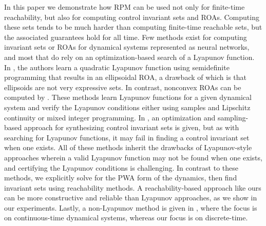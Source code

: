 In this paper we demonstrate how RPM can be used not only for finite-time reachability, but also for computing control invariant sets and ROAs.
Computing these sets tends to be much harder than computing finite-time reachable sets, but the associated guarantees hold for all time. 
Few methods exist for computing invariant sets or ROAs for dynamical systems represented as neural networks, and most that do rely on an optimization-based search of a Lyapunov function. 
In \cite{ellip_roa}, the authors learn a quadratic Lyapunov function using semidefinite programming that results in an ellipsoidal ROA, a drawback of which is that ellipsoids are not very expressive sets. 
In contrast, nonconvex ROAs can be computed by \cite{richards2018lyapunov, chen2021learning, dai2021lyapunov}. 
These methods learn Lyapunov functions for a given dynamical system and verify the Lyapunov conditions either using samples and Lipschitz continuity or mixed integer programming. 
In \cite{control_inv_changliu}, an optimization and sampling-based approach for synthesizing control invariant sets is given, but as with searching for Lyapunov functions, it may fail in finding a control invariant set when one exists. 
All of these methods inherit the drawbacks of Lyapunov-style approaches wherein a valid Lyapunov function may not be found when one exists, and certifying the Lyapunov conditions is challenging.
In contrast to these methods, we explicitly solve for the PWA form of the dynamics, then find invariant sets using reachability methods. 
A reachability-based approach like ours can be more constructive and reliable than Lyapunov approaches, as we show in our experiments.
Lastly, a non-Lyapunov method is given in \cite{jouret2023safety}, where the focus is on continuous-time dynamical systems, whereas our focus is on discrete-time.



